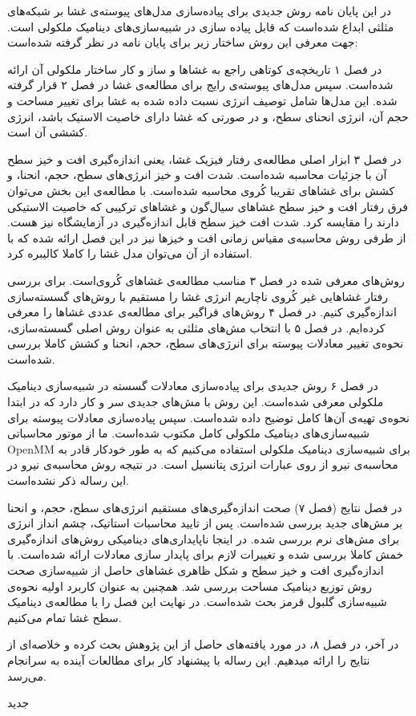 



در این پایان نامه روش جدیدی برای پیاده‌سازی مدل‌های پیوسته‌ی غشا بر شبکه‌های مثلثی ابداع شده‌است که قابل پیاده سازی در شبیه‌سازی‌های دینامیک ملکولی است. جهت معرفی این روش ساختار زیر برای پایان نامه در نظر گرفته شده‌است:

در فصل ۱ تاریخچه‌ی کوتاهی راجع به غشا‌ها و ساز و کار ساختار ملکولی آن  ارائه شده‌است. سپس مدل‌های پیوسته‌ی رایج برای مطالعه‌ی غشا در فصل ۲ قرار گرفته شده. این مدل‌ها شامل توصیف انرژی نسبت داده شده به غشا برای تغییر مساحت و حجم آن، انرژی انحنای سطح، و در صورتی که غشا دارای خاصیت الاستیک باشد، انرژی کششی آن است.

در فصل ۳ ابزار اصلی مطالعه‌ی رفتار فیزیک غشا، یعنی اندازه‌گیری افت و خیز سطح آن با جزئیات محاسبه  شده‌است.  شدت افت و خیز انرژی‌های سطح، حجم، انحنا، و کشش برای غشا‌های تقریبا کُروی  محاسبه شده‌است. با مطالعه‌ی این بخش می‌توان فرق رفتار افت و خیز سطح غشا‌های سیال‌گون و غشا‌های ترکیبی که خاصیت الاستیکی دارند را مقایسه‌ کرد. شدت‌ افت خیز سطح قابل اندازه‌گیری در آزمایشگاه نیز هست. از طرفی روش محاسبه‌ی مقیاس زمانی افت و خیز‌ها نیز در این فصل ارائه شده که با استفاده از آن می‌توان مدل‌ غشا را کاملا کالیبره کرد.

روش‌های معرفی شده در فصل ۳ مناسب مطالعه‌ی غشا‌های کُروی‌است. برای بررسی رفتار غشا‌هایی غیر کُروی ناچاریم انرژی‌ غشا را مستقیم با روش‌های گسسته‌سازی اندازه‌گیری کنیم. در فصل ۴ روش‌های فراگیر برای مطالعه‌ی عددی غشا‌ها را معرفی کرده‌ایم. در فصل ۵ با انتخاب مش‌های مثلثی به عنوان روش اصلی گسسته‌سازی، نحوه‌ی تغییر معادلات پیوسته برای انرژی‌های سطح، حجم، انحنا و کشش کاملا بررسی شده‌است.

در فصل ۶ روش جدیدی برای پیاده‌سازی معادلات گسسته در شبیه‌سازی دینامیک ملکولی معرفی شده‌است. این روش با مش‌های جدیدی سر و کار دارد که در ابتدا نحوه‌ی تهیه‌ی آن‌ها کامل توضیح داده شده‌است. سپس پیاده‌سازی معادلات پیوسته برای شبیه‌سازی‌های دینامیک ملکولی کامل مکتوب شده‌است. ما از موتور محاسباتی 
OpenMM
برای شبیه‌سازی دینامیک ملکولی استفاده می‌کنیم که به طور خودکار قادر به محاسبه‌ی نیرو از روی  عبارات انرژی پتانسیل است. در نتیجه روش محاسبه‌ی نیرو در این رساله ذکر نشده‌است.

در فصل نتایج (فصل ۷) صحت اندازه‌گیری‌های مستقیم انرژی‌های سطح، حجم، و انحنا بر مش‌های جدید بررسی شده‌است. پس از تایید محاسبات استاتیک، چشم انداز انرژی برای  مش‌های نرم بررسی شده. در اینجا ناپایداری‌های دینامیکی روش‌های اندازه‌گیری خمش کاملا بررسی شده و تغییرات لازم برای پایدار سازی معادلات ارائه شده‌است. با اندازه‌گیری افت و خیز سطح و شکل‌ ظاهری غشا‌های حاصل از شبیه‌سازی صحت  روش توزیع دینامیک مساحت بررسی شد. همچنین به عنوان کاربرد اولیه‌ نحوه‌ی شبیه‌سازی گلبول قرمز بحث شده‌است. در نهایت این فصل را با مطالعه‌ی دینامیک سطح غشا تمام می‌کنیم.

در آخر، در فصل ۸، در مورد یافته‌های حاصل از این پژوهش بحث کرده و خلاصه‌ای از نتایج را ارائه میدهیم. این رساله  با پیشنهاد کار برای مطالعات آینده به سرانجام می‌رسد.



‌جدید
